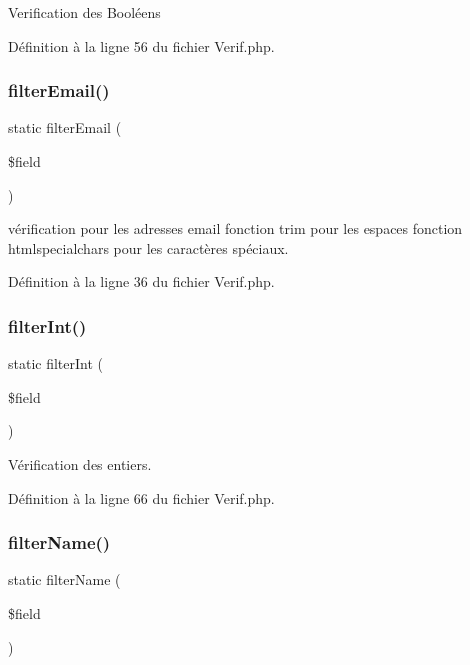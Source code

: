 Verification des Booléens 

Définition à la ligne 56 du fichier Verif.\+php.

\mbox{\label{class_app_1_1_verif_ad27d2a83b777170b7a7309c28b0b6976}} 
\subsubsection{\texorpdfstring{filter\+Email()}{filterEmail()}}
{\footnotesize\ttfamily static filter\+Email (\begin{DoxyParamCaption}\item[{}]{\$field }\end{DoxyParamCaption})\hspace{0.3cm}{\ttfamily [static]}}

vérification pour les adresses email fonction trim pour les espaces fonction htmlspecialchars pour les caractères spéciaux. 

Définition à la ligne 36 du fichier Verif.\+php.

\mbox{\label{class_app_1_1_verif_abb832f72a01d33d452acfc2f67bc776f}} 
\subsubsection{\texorpdfstring{filter\+Int()}{filterInt()}}
{\footnotesize\ttfamily static filter\+Int (\begin{DoxyParamCaption}\item[{}]{\$field }\end{DoxyParamCaption})\hspace{0.3cm}{\ttfamily [static]}}

Vérification des entiers. 

Définition à la ligne 66 du fichier Verif.\+php.

\mbox{\label{class_app_1_1_verif_ae66ae460929735528668ff5a64355e1c}} 
\subsubsection{\texorpdfstring{filter\+Name()}{filterName()}}
{\footnotesize\ttfamily static filter\+Name (\begin{DoxyParamCaption}\item[{}]{\$field }\end{DoxyParamCaption})\hspace{0.3cm}{\ttfamily [static]}}

